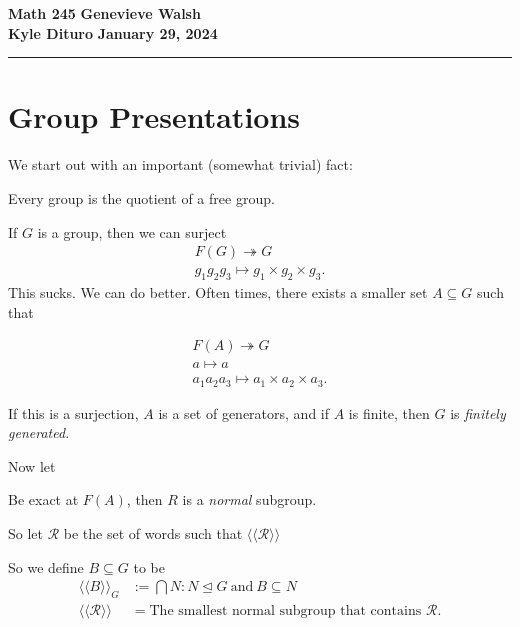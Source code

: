 \documentclass[12pt, twosided]{article}
\begin{document}
\noindent \textbf{Math 245} \hfill \textbf{Genevieve Walsh} \\
\textbf{Kyle Dituro} \hfill \textbf{January 29\tht, 2024}\hrule
\vspace{.2in}

\section{Group Presentations}
We start out with an important (somewhat trivial) fact:

\begin{fact}
  Every group is the quotient of a free group.
\end{fact}

If \(G\) is a group, then we can surject
\begin{align*}
  F(G) \twoheadrightarrow G \\
  g_1g_2g_3 \longmapsto g_1 \times g_2 \times g_3.
\end{align*}
This sucks. We can do better. Often times, there exists a smaller set \(A \subseteq G\) such that

\begin{align*}
  F(A) \twoheadrightarrow G \\
  a \longmapsto a \\
  a_1a_2a_3 \longmapsto a_1 \times a_2 \times a_3.
\end{align*}

If this is a surjection, \(A\) is a set of generators, and if \(A\) is finite, then \(G\) is \textit{finitely generated.}

Now let 
\begin{center}
\end{center}
Be exact at \(F(A)\), then \(R\) is a \textit{normal} subgroup.

So let \(\mathcal{R}\) be the set of words such that \(\langle\langle \mathcal{R}\rangle\rangle\)

So we define \(B \subseteq G\) to be
\begin{align*}
  \langle\langle B \rangle\rangle_G &:= \bigcap N : N \trianglelefteq G \mathrm{\ and\ } B \subseteq N \\
  \langle\langle \mathcal{R} \rangle\rangle &= \text{The smallest normal subgroup that contains } \mathcal{R}.
\end{align*}
\end{document}

